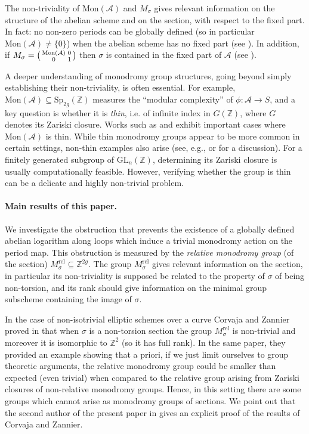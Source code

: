 \documentclass[10 pt,a4paper]{article}
\theoremstyle{plain}
\theoremstyle{definition}
\theoremstyle{named}
\newcommand{\cA}{\mathcal A}
\begin{document}
The non-triviality of $\textrm{Mon}(\cA)$ and $M_\sigma$ gives relevant information on the structure of the abelian scheme and on the section, with respect to the fixed part. In fact: no non-zero periods can be globally defined (so in particular  $\textrm{Mon}(\cA)\neq \{0\}$) when the abelian scheme has no fixed part (see \cite[Lemma 5.6]{GH2}). In addition,  if  $M_\sigma =\begin{psmallmatrix} \mathrm{Mon}(\mathcal{A}) & 0 \\ 0 & 1 \end{psmallmatrix}$ then $\sigma$ is contained in the fixed part of $\mathcal A$ (see ).

A deeper understanding of monodromy group structures, going beyond simply establishing their non-triviality, is often essential. For example, $\textrm{Mon}(\mathcal{A})\subseteq\textrm{Sp}_{2g}(\mathbb Z)$ measures the ``modular complexity'' of $\phi\colon\mathcal{A}\to S$, and a key question is whether it is \emph{thin}, i.e. of infinite index in $G(\mathbb{Z})$, where $G$ denotes its Zariski closure.  Works such as \cite{PONCELET} and \cite{NORI} exhibit important cases where $\textrm{Mon}(\mathcal{A})$ is thin. While thin monodromy groups appear to be more common in certain settings, non-thin examples also arise (see, e.g., \cite{SARNAK} or \cite[Section 2.1]{Ell} for a discussion).  For a finitely generated subgroup of $\textrm{GL}_n(\mathbb{Z})$, determining its Zariski closure is usually computationally feasible. However, verifying whether the group is thin can be a delicate and highly non-trivial problem.

\paragraph{Main results of this paper.} We investigate the obstruction that prevents the existence of a globally defined abelian logarithm along loops which induce a trivial monodromy action on the period map. This obstruction is measured by the \emph{relative monodromy group} (of the section) $M^{\textrm{rel}}_\sigma\subseteq \mathbb Z^{2g}$.
The group $M_\sigma^\textrm{rel}$ gives relevant information on the section, in particular its non-triviality is supposed be related to the property of $\sigma$ of being non-torsion, and its rank should give information on the minimal group subscheme containing the image of $\sigma$. 

In the case of non-isotrivial elliptic schemes over a curve Corvaja and Zannier proved in \cite{CZ} that when $\sigma$  is a non-torsion  section the group $M^{\textrm{rel}}_\sigma$ is non-trivial and moreover it is isomorphic to $\mathbb Z^2$ (so it has full rank). In the same paper, they provided an example showing that a priori, if we just limit ourselves to group theoretic arguments, the relative monodromy group could be smaller than expected (even trivial) when compared to the relative group arising from Zariski closures of non-relative monodromy groups. Hence, in this setting there are some groups which cannot arise as monodromy groups of sections. We point out that the second author of the present paper in \cite{T2} gives an explicit proof of the results of Corvaja and Zannier. 
\end{document}
